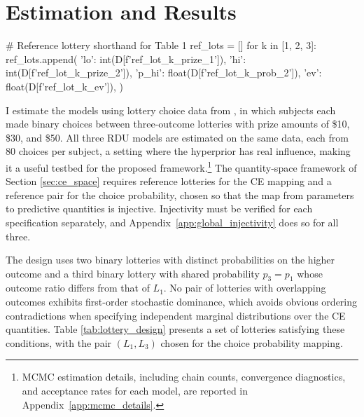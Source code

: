 \documentclass[12pt,a4paper]{article}
\theoremstyle{definition}
\theoremstyle{remark}
\begin{document}
\section{Estimation and Results}
\label{sec:estimation}

\begin{pycode}
# Reference lottery shorthand for Table 1
ref_lots = []
for k in [1, 2, 3]:
    ref_lots.append({
        'lo': int(D[f'ref_lot_{k}_prize_1']),
        'hi': int(D[f'ref_lot_{k}_prize_2']),
        'p_hi': float(D[f'ref_lot_{k}_prob_2']),
        'ev': float(D[f'ref_lot_{k}_ev']),
    })
\end{pycode}

I estimate the models using lottery choice data from \textcite{Harrison2016},
in which  subjects each made
 binary choices between three-outcome lotteries
with prize amounts of \$10, \$30, and \$50. All three RDU models are
estimated on the same data, each from 80 choices per subject, a setting
where the hyperprior has real influence, making it a useful testbed for the
proposed framework.\footnote{
  MCMC estimation details, including chain counts, convergence
  diagnostics, and acceptance rates for each model, are reported in
  Appendix~\ref{app:mcmc_details}.
}
The quantity-space framework of Section \ref{sec:ce_space} requires reference
lotteries for the CE mapping and a reference pair for the choice probability,
chosen so that the map from parameters to predictive quantities is injective.
Injectivity must be verified for each specification separately, and
Appendix~\ref{app:global_injectivity} does so for all three.

The design uses two binary lotteries with distinct probabilities on the higher
outcome and a third binary lottery with shared probability $p_3 = p_1$ whose
outcome ratio differs from that of $L_1$. No pair of lotteries with
overlapping outcomes exhibits first-order stochastic dominance, which avoids
obvious ordering contradictions when specifying independent marginal
distributions over the CE quantities. Table \ref{tab:lottery_design} presents
a set of lotteries satisfying these conditions, with the pair $(L_1, L_3)$
chosen for the choice probability mapping.
\end{document}
